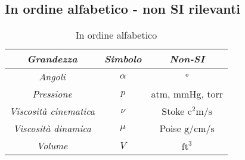 \subsection*{In ordine alfabetico - non SI rilevanti}
		\begin{longtable}{ccc}
			\caption{In ordine alfabetico} \\
			\toprule
				\textbf{\textit{Grandezza}}	&	\textbf{\textit{Simbolo}}	&	\textbf{\textit{Non-SI}}\\
			\toprule
			\endhead
				\textit{Angoli}		&		$\alpha$		&		\si{\degree}	\\
			\midrule						
				\textit{Pressione}		&		$p$		&		atm, mmHg, torr	\\
			\midrule
				\textit{Viscosità cinematica}		&		$\nu$		&		Stoke $\si{\square \centi \meter \per \second}$	\\
			\midrule
				\textit{Viscosità dinamica}		&		$\mu$		&		Poise $\si{\gram \per \centi \meter \per \second}$	\\
			\midrule
				\textit{Volume}		&		$V$		&		$\text{ft}^3$\\										
			\bottomrule
		\end{longtable}
\clearpage
